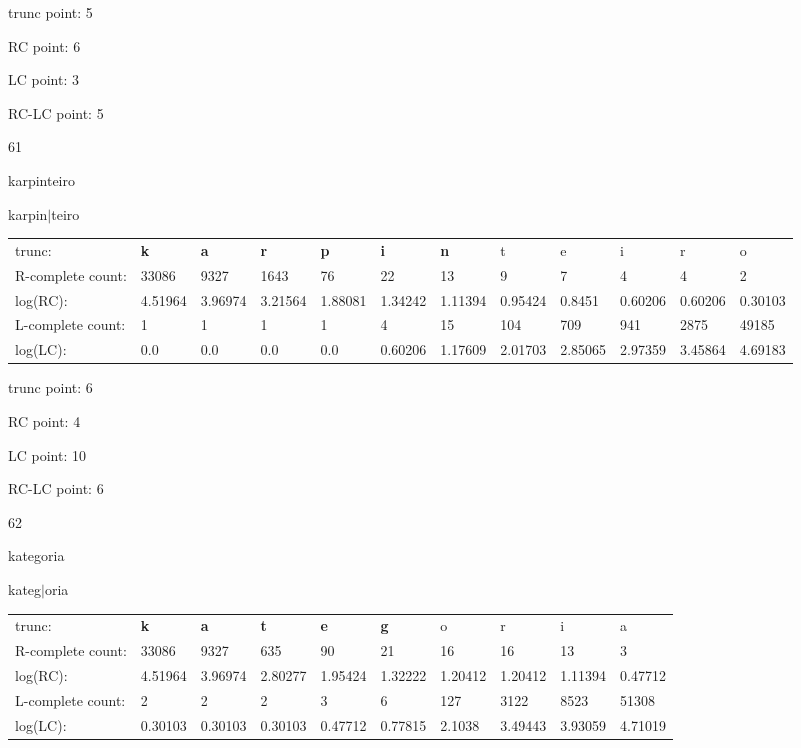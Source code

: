 \documentclass{article}
\begin{document}
trunc point: 5

RC point: 6

LC point: 3

RC-LC point: 5

\vspace{3em}



61

karpinteiro

karpin$|$teiro

\vspace{1em}

\begin{tabular}{l|lllllllllll}

trunc: & {\color{red}\bf k} & {\color{red}\bf a} & {\color{red}\bf r} & {\color{red}\bf p} & {\color{red}\bf i} & {\color{red}\bf n} & t & e & i & r & o \\ 
R-complete count: & 33086 & 9327 & 1643 & 76 & 22 & 13 & 9 & 7 & 4 & 4 & 2 \\ 
log(RC): & 4.51964 & 3.96974 & 3.21564 & 1.88081 & 1.34242 & 1.11394 & 0.95424 & 0.8451 & 0.60206 & 0.60206 & 0.30103 \\ 
L-complete count: & 1 & 1 & 1 & 1 & 4 & 15 & 104 & 709 & 941 & 2875 & 49185 \\ 
log(LC): & 0.0 & 0.0 & 0.0 & 0.0 & 0.60206 & 1.17609 & 2.01703 & 2.85065 & 2.97359 & 3.45864 & 4.69183 \\ 
\end{tabular}

trunc point: 6

RC point: 4

LC point: 10

RC-LC point: 6

\vspace{3em}



62

kategoria

kateg$|$oria

\vspace{1em}

\begin{tabular}{l|lllllllll}

trunc: & {\color{red}\bf k} & {\color{red}\bf a} & {\color{red}\bf t} & {\color{red}\bf e} & {\color{red}\bf g} & o & r & i & a \\ 
R-complete count: & 33086 & 9327 & 635 & 90 & 21 & 16 & 16 & 13 & 3 \\ 
log(RC): & 4.51964 & 3.96974 & 2.80277 & 1.95424 & 1.32222 & 1.20412 & 1.20412 & 1.11394 & 0.47712 \\ 
L-complete count: & 2 & 2 & 2 & 3 & 6 & 127 & 3122 & 8523 & 51308 \\ 
log(LC): & 0.30103 & 0.30103 & 0.30103 & 0.47712 & 0.77815 & 2.1038 & 3.49443 & 3.93059 & 4.71019 \\ 
\end{tabular}
\end{document}
